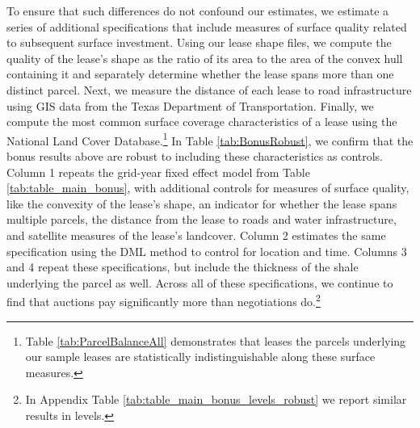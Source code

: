 \documentclass[12pt]{article}
\begin{document}
To ensure that such differences do not confound our estimates, we estimate a series of additional specifications that include  measures of surface quality related to subsequent surface investment.  Using our lease shape files, we compute the quality of the lease's shape as the ratio of its area to the area of the convex hull containing it and separately determine whether the lease spans more than one distinct parcel.  Next, we measure the distance of each lease to road infrastructure using GIS data from the Texas Department of Transportation.  Finally, we compute the most common surface coverage characteristics of a lease using the National Land Cover Database.\footnote{Table \ref{tab:ParcelBalanceAll} demonstrates that leases the parcels underlying our sample leases are statistically indistinguishable along these surface measures.}  In Table \ref{tab:BonusRobust}, we confirm that the bonus results above are robust to including these characteristics as controls. Column 1 repeats the grid-year fixed effect model from Table \ref{tab:table_main_bonus}, with additional controls for measures of surface quality, like the convexity of the lease's shape, an indicator for whether the lease spans multiple parcels, the distance from the lease to roads and water infrastructure, and satellite measures of the lease's landcover. Column 2 estimates the same specification using the DML method to control for location and time. Columns 3 and 4 repeat these specifications, but include the thickness of the shale underlying the parcel as well. Across all of these specifications, we continue to find that auctions pay significantly more than negotiations do.\footnote{In Appendix Table \ref{tab:table_main_bonus_levels_robust} we report similar results in levels.}
\end{document}
